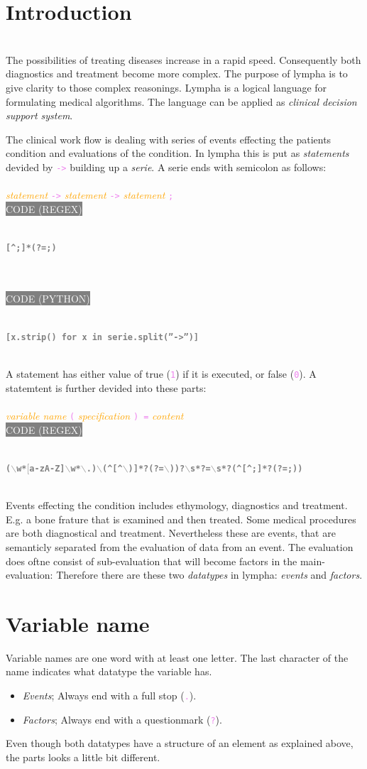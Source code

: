 \documentclass[15pt,a4paper,oneside]{article}
\newcommand{\regex}[1]{{\tiny\\\colorbox{grey}{\textcolor{white}{CODE (REGEX)}\hspace{0.87\textwidth}}}\vspace{-2.2em}\\\begin{framed}\bf{\textcolor{grey}{\vspace{-1.5em}\\\texttt{\small #1}}}\vspace{-0.33em}\end{framed}\vspace{-0.75em}}
\newcommand{\python}[1]{{\tiny\\\colorbox{grey}{\textcolor{white}{\tiny CODE (PYTHON)}\hspace{0.855\textwidth}}}\vspace{-2.2em}\\\begin{framed}\bf{\textcolor{grey}{\vspace{-1.5em}\\\texttt{\small #1}}}\vspace{-0.33em}\end{framed}\vspace{-0.75em}}
\newcommand{\code}[1]{{\textcolor{violet}{\texttt{\small #1}}}}
\newcommand{\comment}[1]{{\textcolor{orange}{\it #1}}}
\begin{document}
\section{Introduction}
\ \\
The possibilities of treating diseases increase in a rapid speed. Consequently both diagnostics and treatment become more complex. The purpose of {\sc lympha} is to give clarity to those complex reasonings. {\sc Lympha} is a logical language for formulating medical algorithms. The language can be applied as {\it clinical decision support system}.

The clinical work flow is dealing with series of events effecting the patients condition and evaluations of the condition. In {\sc lympha} this is put as {\it statements} devided by \code{->} building up a {\it serie}. A serie ends with semicolon as follows:\\\\
\comment{statement} \code{->} \comment{statement} \code{->} \comment{statement} \code{;}
\regex{[\textasciicircum ;]*(?=;)}
\ \vspace{-2em}\\
\python{[x.strip() for x in serie.split(''->'')]}
\ \\
A statement has either value of true (\code{1}) if it is executed, or false (\code{0}). A statemtent is further devided into these parts:\\\\
\comment{variable name} \code{(} \comment{specification} \code{) =} \comment{content}
\regex{($\backslash$w*$[$a-zA-Z]$\backslash$w*$\backslash$.)$\backslash$(\textasciicircum[\textasciicircum$\backslash$)]*?(?=$\backslash$))?$\backslash$s*?=$\backslash$s*?(\textasciicircum[\textasciicircum ;]*?(?=;))}
\ \\
Events effecting the condition includes ethymology, diagnostics and treatment. E.g. a bone frature that is examined and then treated. Some medical procedures are both diagnostical and treatment. Nevertheless these are events, that are semanticly separated from the evaluation of data from an event. The evaluation does oftne consist of sub-evaluation that will become factors in the main-evaluation: Therefore there are these two {\it datatypes} in {\sc lympha}: {\it events} and {\it factors}.
\section{Variable name}
Variable names are one word with at least one letter. The last character of the name indicates what datatype the variable has.
\begin{itemize}
\item {\it Events}; Always end with a full stop (\code{.}).
\item {\it Factors}; Always end with a questionmark (\code{?}).
\end{itemize}
Even though both datatypes have a structure of an element as explained above, the parts looks a little bit different.
\end{document}
